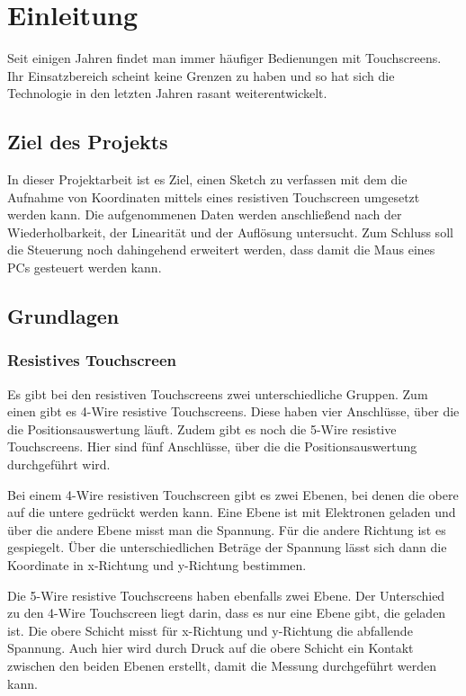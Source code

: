 \chapter{Einleitung}
Seit einigen Jahren findet man immer häufiger Bedienungen mit Touchscreens.
Ihr Einsatzbereich scheint keine Grenzen zu haben und so hat sich die Technologie in den letzten Jahren rasant weiterentwickelt.


\section{Ziel des Projekts}
In dieser Projektarbeit ist es Ziel, einen Sketch zu verfassen mit dem die Aufnahme von Koordinaten mittels eines resistiven Touchscreen umgesetzt werden kann.
Die aufgenommenen Daten werden anschließend nach der Wiederholbarkeit, der Linearität und der Auflösung untersucht.
Zum Schluss soll die Steuerung noch dahingehend erweitert werden, dass damit die Maus eines PCs gesteuert werden kann.


\section{Grundlagen}
\subsection{Resistives Touchscreen}
Es gibt bei den resistiven Touchscreens zwei unterschiedliche Gruppen.
Zum einen gibt es 4-Wire resistive Touchscreens.
Diese haben vier Anschlüsse, über die die Positionsauswertung läuft.
Zudem gibt es noch die 5-Wire resistive Touchscreens.
Hier sind fünf Anschlüsse, über die die Positionsauswertung durchgeführt wird.

Bei einem 4-Wire resistiven Touchscreen gibt es zwei Ebenen, bei denen die obere auf die untere gedrückt werden kann.
Eine Ebene ist mit Elektronen geladen und über die andere Ebene misst man die Spannung.
Für die andere Richtung ist es gespiegelt.
Über die unterschiedlichen Beträge der Spannung lässt sich dann die Koordinate in x-Richtung und y-Richtung bestimmen.

Die 5-Wire resistive Touchscreens haben ebenfalls zwei Ebene.
Der Unterschied zu den 4-Wire Touchscreen liegt darin, dass es nur eine Ebene gibt, die geladen ist.
Die obere Schicht misst  für x-Richtung und y-Richtung die abfallende Spannung.
Auch hier wird durch Druck auf die obere Schicht ein Kontakt zwischen den beiden Ebenen erstellt, damit die Messung durchgeführt werden kann.

